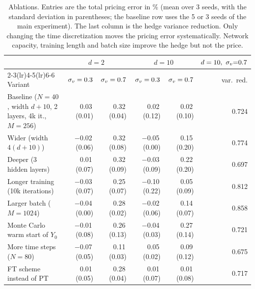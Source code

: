 \begin{table}[t]
\centering\small
\setlength{\tabcolsep}{4pt}
\begin{tabular}{l rr rr r}
\toprule
 & \multicolumn{2}{c}{$d=2$} & \multicolumn{2}{c}{$d=10$} & $d=10,\ \sv{=}0.7$\\
\cmidrule(lr){2-3}\cmidrule(lr){4-5}\cmidrule(lr){6-6}
Variant & $\sigma_v=0.3$ & $\sigma_v=0.7$ & $\sigma_v=0.3$ & $\sigma_v=0.7$ & var.\ red.\\
\midrule
Baseline ($N{=}40$, width $d{+}10$, 2 layers, 4k it., $M{=}256$) & 0.03\,{\scriptsize(0.01)} & 0.32\,{\scriptsize(0.04)} & 0.02\,{\scriptsize(0.12)} & 0.02\,{\scriptsize(0.10)} & 0.724\\
Wider (width $4(d{+}10)$) & $-$0.02\,{\scriptsize(0.06)} & 0.32\,{\scriptsize(0.08)} & $-$0.05\,{\scriptsize(0.00)} & 0.15\,{\scriptsize(0.20)} & 0.774\\
Deeper (3 hidden layers) & 0.01\,{\scriptsize(0.07)} & 0.32\,{\scriptsize(0.09)} & $-$0.03\,{\scriptsize(0.09)} & 0.22\,{\scriptsize(0.20)} & 0.697\\
Longer training (10k iterations) & $-$0.03\,{\scriptsize(0.07)} & 0.25\,{\scriptsize(0.07)} & $-$0.10\,{\scriptsize(0.22)} & 0.05\,{\scriptsize(0.09)} & 0.812\\
Larger batch ($M=1024$) & $-$0.04\,{\scriptsize(0.00)} & 0.28\,{\scriptsize(0.02)} & $-$0.02\,{\scriptsize(0.06)} & 0.14\,{\scriptsize(0.07)} & 0.858\\
Monte Carlo warm start of $Y_0$ & $-$0.01\,{\scriptsize(0.08)} & 0.26\,{\scriptsize(0.13)} & $-$0.04\,{\scriptsize(0.03)} & 0.27\,{\scriptsize(0.14)} & 0.721\\
More time steps ($N=80$) & $-$0.07\,{\scriptsize(0.05)} & 0.11\,{\scriptsize(0.03)} & 0.05\,{\scriptsize(0.02)} & 0.09\,{\scriptsize(0.12)} & 0.675\\
FT scheme instead of PT & 0.01\,{\scriptsize(0.05)} & 0.28\,{\scriptsize(0.04)} & 0.01\,{\scriptsize(0.07)} & 0.01\,{\scriptsize(0.08)} & 0.717\\
\bottomrule
\end{tabular}
\caption{Ablations. Entries are the total pricing error in \% (mean over 3 seeds, with the standard deviation in parentheses; the baseline row uses the 5 or 3 seeds of the main experiment). The last column is the hedge variance reduction. Only changing the time discretization moves the pricing error systematically. Network capacity, training length and batch size improve the hedge but not the price.}
\label{tab:ablation}
\end{table}
